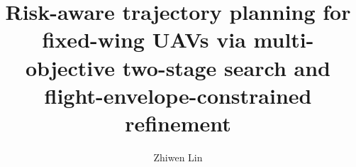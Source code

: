 \documentclass[preprint,12pt]{elsarticle}
\begin{document}
\begin{frontmatter}



\title{Risk-aware trajectory planning for fixed-wing UAVs via multi-objective two-stage search and flight-envelope-constrained refinement}


\author{Zhiwen Lin}


\end{frontmatter}
\end{document}
